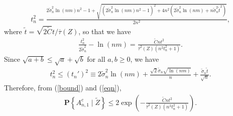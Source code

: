 \documentclass[12pt, fullpage]{amsart}
\theoremstyle{definition}
\theoremstyle{definition}
\theoremstyle{definition}
\begin{document}
\begin{bibunit}[econometrica]
\begin{align}
	\label{eqn2}
	 t_n^2 =  \frac{2 \tilde \sigma_n^2 \ln(n m) n^2 - 1 + \sqrt{ \left(2 \tilde \sigma_n^2 \ln(n m) n^2 - 1 \right)^2 + 4n^2\left( 2 \tilde \sigma_n^2 \ln(n m) + n \tilde \sigma_n^2 \tilde t^2 \right)}}{2 n^2},
\end{align}
where $\tilde t = \sqrt{2 \tilde C} t / \overline \tau(Z)$, so that we have
\begin{align}
	\label{eqn}
	\frac{t_n^2}{2\tilde \sigma_n^2} - \ln(n m) = \frac{\tilde C n t^2}{\overline \tau^2(Z) \left(n^2 t_n^2 + 1 \right)}.
\end{align}
Since $\sqrt{a + b} \le \sqrt{a} + \sqrt{b}$ for all $a,b \ge0$, we have
\begin{align}
	\label{bound232}
	t_n^2 \le (t_n')^2 \equiv 2 \tilde \sigma_n^2 \ln(n m) + \frac{\sqrt{2} \tilde \sigma_n \sqrt{\ln(n m)}}{n} + \frac{ \tilde \sigma_n \tilde t}{\sqrt{n}}.
\end{align}
Therefore, from (\ref{bound}) and (\ref{eqn}),
\begin{align}
	\label{ineq52}
	\mathbf{P}\left\{ A_{n,1}^c \mid \tilde Z \right\} \le 2 \exp\left(  - \frac{\tilde C n t^2}{\overline \tau^2(Z)  \left(n^2 t_n^2 + 1\right)} \right).
\end{align}


\end{bibunit}
\end{document}
